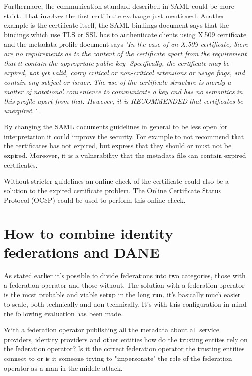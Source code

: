Furthermore, the communication standard described in SAML could be more strict.
That involves the first certificate exchange just mentioned. 
Another example is the certificate itself, the SAML bindings document says  
that the bindings which use TLS or SSL has to authenticate clients using X.509 certificate \cite[p.~8]{pdf:oasis-open-bindings} and the metadata profile document says
\emph{"In the case of an X.509 certificate, there are no requirements as to the content of the certificate apart from the requirement 
that it contain the appropriate public key. 
Specifically, the certificate may be expired, not yet valid, carry critical or non-critical extensions or usage flags, and contain 
any subject or issuer. 
The use of the certificate structure is merely a matter of notational convenience to communicate a key and has no semantics in this 
profile apart from that. 
However, it is RECOMMENDED that certificates be unexpired."} \cite[p.~11]{pdf:oasis-open-metadata-profile}. 

By changing the SAML documents guidelines in general to be less open for interpretation it could improve the security. 
For example to not recommend that the certificates has not expired, but express that they should or must not be expired. 
Moreover, it is a vulnerability that the metadata file can contain expired certificates.

Without stricter guidelines an online check of the certificate could also be a solution to the expired certificate problem. 
The Online Certificate Status Protocol (OCSP) \cite{rfc:6277} could be used to perform this online check.

\section{How to combine identity federations and DANE}
As stated earlier it's possible to divide federations into two categories, those with a federation operator and those without.
The solution with a federation operator is the most probable and viable setup in the long run, it's basically much easier to scale, both technically and non-technically.
It's with this configuration in mind the following evaluation has been made.


With a federation operator publishing all the metadata about all service providers, identity providers and other entities how do the trusting entites rely on the federation operator?
Is it the correct federation operator the trusting entities connect to or is it someone trying to "impersonate" the role of the federation operator as a man-in-the-middle attack.

